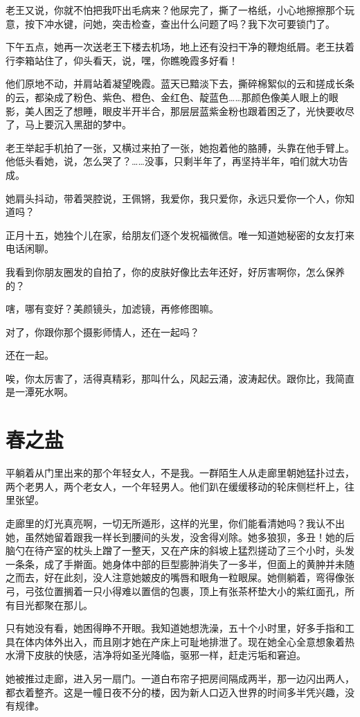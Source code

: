 \documentclass[lang=cn,newtx,12pt,scheme=chinese]{elegantbook}
\begin{document}
老王又说，你就不怕把我吓出毛病来？他尿完了，撕了一格纸，小心地擦擦那个玩意，按下冲水键，问她，突击检查，查出什么问题了吗？我下次可要锁门了。

下午五点，她再一次送老王下楼去机场，地上还有没扫干净的鞭炮纸屑。老王扶着行李箱站住了，仰头看天，说，嘿，你瞧晚霞多好看！

他们原地不动，并肩站着凝望晚霞。蓝天已黯淡下去，撕碎棉絮似的云和搓成长条的云，都染成了粉色、紫色、橙色、金红色、靛蓝色……那颜色像美人眼上的眼影，美人困乏了想睡，眼皮半开半合，那层层蓝紫金粉也跟着困乏了，光快要收尽了，马上要沉入黑甜的梦中。

老王举起手机拍了一张，又横过来拍了一张，她抱着他的胳膊，头靠在他手臂上。他低头看她，说，怎么哭了？……没事，只剩半年了，再坚持半年，咱们就大功告成。

她肩头抖动，带着哭腔说，王佩锵，我爱你，我只爱你，永远只爱你一个人，你知道吗？

正月十五，她独个儿在家，给朋友们逐个发祝福微信。唯一知道她秘密的女友打来电话闲聊。

我看到你朋友圈发的自拍了，你的皮肤好像比去年还好，好厉害啊你，怎么保养的？

嗐，哪有变好？美颜镜头，加滤镜，再修修图嘛。

对了，你跟你那个摄影师情人，还在一起吗？

还在一起。

唉，你太厉害了，活得真精彩，那叫什么，风起云涌，波涛起伏。跟你比，我简直是一潭死水啊。
\chapter{春之盐}
平躺着从门里出来的那个年轻女人，不是我。一群陌生人从走廊里朝她猛扑过去，两个老男人，两个老女人，一个年轻男人。他们趴在缓缓移动的轮床侧栏杆上，往里张望。

走廊里的灯光真亮啊，一切无所遁形，这样的光里，你们能看清她吗？我认不出她，虽然她留着跟我一样长到腰间的头发，没舍得刈除。她多狼狈，多丑！她的后脑勺在待产室的枕头上蹭了一整天，又在产床的斜坡上猛烈搓动了三个小时，头发一条条，成了手擀面。她身体中部的巨型膨肿消失了一多半，但面上的黄肿并未随之而去，好在此刻，没人注意她皴皮的嘴唇和眼角一粒眼屎。她侧躺着，弯得像张弓，弓弦位置搁着一只小得难以置信的包裹，顶上有张茶杯垫大小的紫红面孔，所有目光都聚在那儿。

只有她没有看，她困得睁不开眼。我知道她想洗澡，五十个小时里，好多手指和工具在体内体外出入，而且刚才她在产床上可耻地排泄了。现在她全心全意想象着热水滑下皮肤的快感，洁净将如圣光降临，驱邪一样，赶走污垢和窘迫。

她被推过走廊，进入另一扇门。一道白布帘子把房间隔成两半，那一边闪出两人，都衣着整齐。这是一幢日夜不分的楼，因为新人口迈入世界的时间多半凭兴趣，没有规律。
\end{document}
